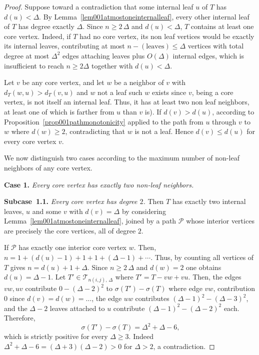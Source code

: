 \documentclass[10pt,a4paper]{amsart}
\newcommand{\TT}{\mathcal{T}}
\begin{document}
\begin{proof}
Suppose toward a contradiction that some
internal leaf $u$ of $T$ has $d(u)<\Delta$. By
Lemma~\ref{lem001atmostoneinternalleaf}, every other internal leaf of $T$
has degree exactly $\Delta$. Since $n\geqslant 2\,\Delta$ and $d(u)<\Delta$, $T$
contains at least one core vertex. Indeed, if $T$ had no core vertex, its non leaf vertices would be exactly its internal leaves, contributing at most
$n-(\text{leaves}) \leqslant \Delta$ vertices with total degree at most $\Delta^2$
edges attaching leaves plus $O(\Delta)$ internal edges, which is insufficient
to reach $n\geqslant 2\Delta$ together with $d(u)<\Delta$.

Let $v$ be any core vertex, and let $w$ be a neighbor of $v$ with $d_T(w,u)>d_T(v,u)$ and $w$ not a leaf such $w$ exists since $v$, being a core vertex, is not itself an internal leaf. Thus, it has at least two non leaf neighbors, at least one of which is farther from
$u$ than $v$ is). If $d(v)>d(u)$, according to Proposition~\ref{prop001pathmonotonicity}
applied to the path from $u$ through $v$ to $w$ where $d(w)\geqslant 2$,
contradicting that $w$ is not a leaf. Hence $d(v)\leqslant d(u)$ for every core
vertex $v$.

We now distinguish two cases according to the maximum number of non-leaf
neighbors of any core vertex.

\medskip

\noindent \textbf{Case 1.} \textit{Every core vertex has exactly two non-leaf neighbors.}

\smallskip

\textbf{Subcase~1.1.} \emph{Every core vertex has degree $2$.} Then $T$ has exactly
two internal leaves, $u$ and some $v$ with $d(v)=\Delta$ by considering 
Lemma~\ref{lem001atmostoneinternalleaf}, joined by a path $\mathcal P$ whose
interior vertices are precisely the core vertices, all of degree $2$.

If $\mathcal P$ has exactly one interior core vertex $w$. Then, $n=1+(d(u)-1)+1+1+(\Delta-1)+\cdots$.  Thus, by counting all vertices of $T$ gives
$n=d(u)+1+\Delta$. Since $n\geqslant 2\,\Delta$ and $d(w)=2$ one
obtains $d(u)=\Delta-1$.  Let $T'\in \TT_{n(i,j),\,\Delta}$ where  $T' = T-vw+vu$. Then, the edges $vw,uv$ contribute
$0-(\Delta-2)^2$ to $\sigma(T')-\sigma(T)$ where edge $vw$, contribution $0$ since
$d(v)=d(w)=\ldots$, the edge $uw$   contributes $(\Delta-1)^2-(\Delta-3)^2$, and the $\Delta-2$ leaves attached to $u$ contribute $(\Delta-1)^2-(\Delta-2)^2$ each. Therefore,
\begin{equation}~\label{eqq01subcase1a}
\sigma(T')-\sigma(T)=\Delta^2+\Delta-6,
\end{equation}
which is strictly positive for every $\Delta\geqslant 3$. Indeed
$\Delta^2+\Delta-6=(\Delta+3)(\Delta-2)>0$ for $\Delta>2$, a contradiction.


\end{proof}
\end{document}
